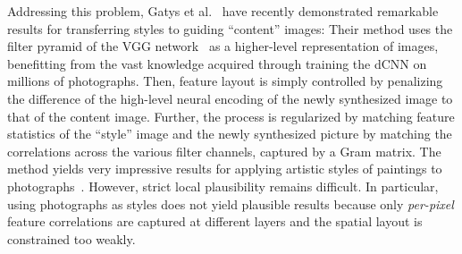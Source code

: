 \documentclass[10pt,twocolumn,letterpaper]{article}
\begin{document}

Addressing this problem, Gatys et al.~\cite{Gatys15,Gatys2015b} have recently demonstrated remarkable results for transferring styles to guiding ``content'' images: Their method uses the filter pyramid of the VGG network~\cite{Simonyan14c} as a higher-level representation of images, benefitting from the vast knowledge acquired through training the dCNN on millions of photographs. Then, feature layout is simply controlled by penalizing the difference of the high-level neural encoding of the newly synthesized image to that of the content image. Further, the process is regularized by matching feature statistics of the ``style'' image and the newly synthesized picture by matching the correlations across the various filter channels, captured by a Gram matrix. The method yields very impressive results for applying artistic styles of paintings to photographs~\cite{Gatys15}. However, strict local plausibility remains difficult. In particular, using photographs as styles does not yield plausible results because only \emph{per-pixel} feature correlations are captured at different layers and the spatial layout is constrained too weakly.
\end{document}
